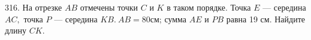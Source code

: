316. На отрезке $AB$ отмечены точки $C$ и $K$ в таком порядке. Точка $E$ --- середина $AC,$ точка $P$ --- середина $KB.\ AB = 80$см; сумма $AE$ и $PB$ равна 19 см. Найдите длину $CK.$\\
